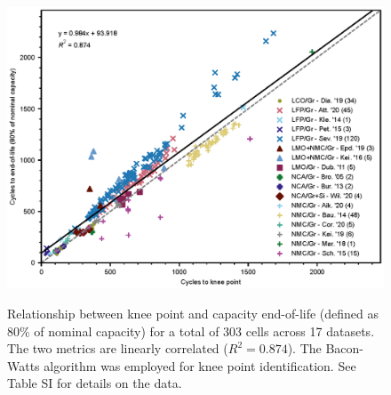\documentclass[journal=jpclcd,manuscript=article]{achemso}
\newcommand{\cmark}{\textcolor{blue}{\textrm{\ding{52}}}}%
\newcommand{\gbox}[1]{{
\fbox{
\parbox{0.8\textwidth}{  \fbox{$\triangleright$\textcolor{blue}{\textbf{Gon}:}} 
#1
}}}}
\begin{document}

\begin{figure}[ht]
\centering
\includegraphics[scale=1.0]{figures/knee_point_eol_linear_relations.eps}
  \label{fig:kneepoint2EOL}
\caption{Relationship between knee point and capacity end-of-life (defined as 80\% of nominal capacity) for a total of 303 cells across 17 datasets. The two metrics are linearly correlated ($R^2 = 0.874$). The Bacon-Watts algorithm was employed for knee point identification. See Table SI for details on the data.}
\label{fig:knees2EOL}
\end{figure}


\end{document}
